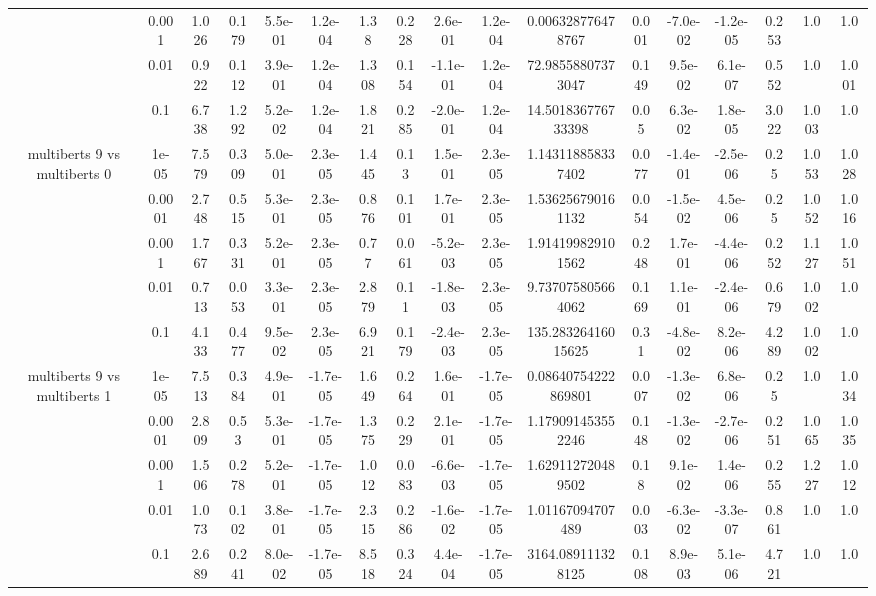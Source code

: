 \begin{tabular}{|c|c|c|c|c|c|c|c|c|c|c|c|c|c|c|c|c|}
 & 0.001 & 1.026 & 0.179 & 5.5e-01 & 1.2e-04 & 1.38 & 0.228 & 2.6e-01 & 1.2e-04 & 0.006328776478767 & 0.001 & -7.0e-02 & -1.2e-05 & 0.253 & 1.0 & 1.0 \\
 & 0.01 & 0.922 & 0.112 & 3.9e-01 & 1.2e-04 & 1.308 & 0.154 & -1.1e-01 & 1.2e-04 & 72.98558807373047 & 0.149 & 9.5e-02 & 6.1e-07 & 0.552 & 1.0 & 1.001 \\
 & 0.1 & 6.738 & 1.292 & 5.2e-02 & 1.2e-04 & 1.821 & 0.285 & -2.0e-01 & 1.2e-04 & 14.501836776733398 & 0.05 & 6.3e-02 & 1.8e-05 & 3.022 & 1.003 & 1.0 \\
\hline
\multirow{5}{*}{multiberts 9 vs multiberts 0} & 1e-05 & 7.579 & 0.309 & 5.0e-01 & 2.3e-05 & 1.445 & 0.13 & 1.5e-01 & 2.3e-05 & 1.143118858337402 & 0.077 & -1.4e-01 & -2.5e-06 & 0.25 & 1.053 & 1.028 \\
 & 0.0001 & 2.748 & 0.515 & 5.3e-01 & 2.3e-05 & 0.876 & 0.101 & 1.7e-01 & 2.3e-05 & 1.536256790161132 & 0.054 & -1.5e-02 & 4.5e-06 & 0.25 & 1.052 & 1.016 \\
 & 0.001 & 1.767 & 0.331 & 5.2e-01 & 2.3e-05 & 0.77 & 0.061 & -5.2e-03 & 2.3e-05 & 1.914199829101562 & 0.248 & 1.7e-01 & -4.4e-06 & 0.252 & 1.127 & 1.051 \\
 & 0.01 & 0.713 & 0.053 & 3.3e-01 & 2.3e-05 & 2.879 & 0.11 & -1.8e-03 & 2.3e-05 & 9.737075805664062 & 0.169 & 1.1e-01 & -2.4e-06 & 0.679 & 1.002 & 1.0 \\
 & 0.1 & 4.133 & 0.477 & 9.5e-02 & 2.3e-05 & 6.921 & 0.179 & -2.4e-03 & 2.3e-05 & 135.28326416015625 & 0.31 & -4.8e-02 & 8.2e-06 & 4.289 & 1.002 & 1.0 \\
\hline
\multirow{5}{*}{multiberts 9 vs multiberts 1} & 1e-05 & 7.513 & 0.384 & 4.9e-01 & -1.7e-05 & 1.649 & 0.264 & 1.6e-01 & -1.7e-05 & 0.08640754222869801 & 0.007 & -1.3e-02 & 6.8e-06 & 0.25 & 1.0 & 1.034 \\
 & 0.0001 & 2.809 & 0.53 & 5.3e-01 & -1.7e-05 & 1.375 & 0.229 & 2.1e-01 & -1.7e-05 & 1.179091453552246 & 0.148 & -1.3e-02 & -2.7e-06 & 0.251 & 1.065 & 1.035 \\
 & 0.001 & 1.506 & 0.278 & 5.2e-01 & -1.7e-05 & 1.012 & 0.083 & -6.6e-03 & -1.7e-05 & 1.629112720489502 & 0.18 & 9.1e-02 & 1.4e-06 & 0.255 & 1.227 & 1.012 \\
 & 0.01 & 1.073 & 0.102 & 3.8e-01 & -1.7e-05 & 2.315 & 0.286 & -1.6e-02 & -1.7e-05 & 1.01167094707489 & 0.003 & -6.3e-02 & -3.3e-07 & 0.861 & 1.0 & 1.0 \\
 & 0.1 & 2.689 & 0.241 & 8.0e-02 & -1.7e-05 & 8.518 & 0.324 & 4.4e-04 & -1.7e-05 & 3164.089111328125 & 0.108 & 8.9e-03 & 5.1e-06 & 4.721 & 1.0 & 1.0 \\

\end{tabular}
